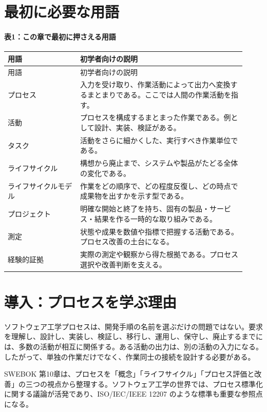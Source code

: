 \documentclass[uplatex,dvipdfmx,a4paper,11pt]{jsarticle}
\begin{document}
\section{最初に必要な用語}
\paragraph{表1：この章で最初に押さえる用語}
\begin{longtable}{>{\raggedright\arraybackslash}p{0.28\linewidth}>{\raggedright\arraybackslash}p{0.64\linewidth}}
\toprule
用語 & 初学者向けの説明\\
\midrule
\endfirsthead
\toprule
用語 & 初学者向けの説明\\
\midrule
\endhead
プロセス & 入力を受け取り、作業活動によって出力へ変換するまとまりである。ここでは人間の作業活動を指す。\\
活動 & プロセスを構成するまとまった作業である。例として設計、実装、検証がある。\\
タスク & 活動をさらに細かくした、実行すべき作業単位である。\\
ライフサイクル & 構想から廃止まで、システムや製品がたどる全体の変化である。\\
ライフサイクルモデル & 作業をどの順序で、どの程度反復し、どの時点で成果物を出すかを示す型である。\\
プロジェクト & 明確な開始と終了を持ち、固有の製品・サービス・結果を作る一時的な取り組みである。\\
測定 & 状態や成果を数値や指標で把握する活動である。プロセス改善の土台になる。\\
経験的証拠 & 実際の測定や観察から得た根拠である。プロセス選択や改善判断を支える。\\
\bottomrule
\end{longtable}
\section{導入：プロセスを学ぶ理由}
ソフトウェア工学プロセスは、開発手順の名前を選ぶだけの問題ではない。要求を理解し、設計し、実装し、検証し、移行し、運用し、保守し、廃止するまでには、多数の活動が相互に関係する。ある活動の出力は、別の活動の入力になる。したがって、単独の作業だけでなく、作業同士の接続を設計する必要がある。

SWEBOK 第10章は、プロセスを「概念」「ライフサイクル」「プロセス評価と改善」の三つの視点から整理する。ソフトウェア工学の世界では、プロセス標準化に関する議論が活発であり、ISO/IEC/IEEE 12207 のような標準も重要な参照点になる。
\end{document}
